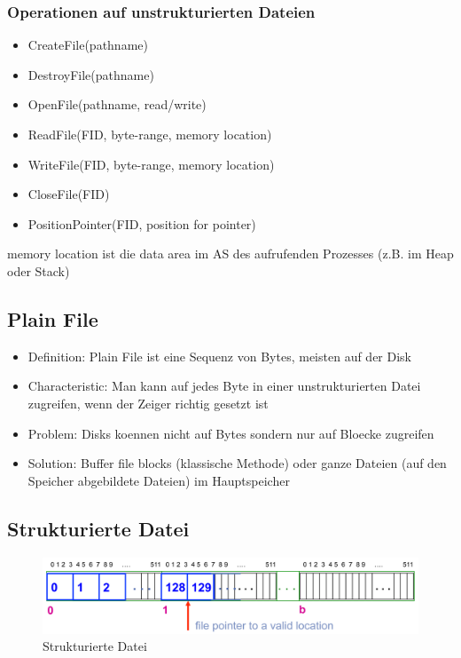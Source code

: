 \documentclass[a4paper]{scrreprt}
\begin{document}
\subsubsection{Operationen auf unstrukturierten Dateien}
\begin{itemize}
	\item CreateFile(pathname)
	\item DestroyFile(pathname)
	\item OpenFile(pathname, read/write)
	\item ReadFile(FID, byte-range, memory location)
	\item WriteFile(FID, byte-range, memory location)
	\item CloseFile(FID)
	\item PositionPointer(FID, position for pointer)
\end{itemize}

memory location ist die data area im AS des aufrufenden Prozesses (z.B. im Heap oder Stack)

\subsection{Plain File}
\begin{itemize}
	\item Definition: Plain File ist eine Sequenz von Bytes, meisten auf der Disk
	\item Characteristic: Man kann auf jedes Byte in einer unstrukturierten Datei zugreifen, wenn der Zeiger richtig gesetzt ist
	\item Problem: Disks koennen nicht auf Bytes sondern nur auf Bloecke zugreifen
	\item Solution: Buffer file blocks (klassische Methode) oder ganze Dateien (auf den Speicher abgebildete Dateien) im Hauptspeicher
\end{itemize}

\subsection{Strukturierte Datei}

\begin{figure}[ht]
\centering
\includegraphics[scale=0.4]{structured_file.png}
\caption{Strukturierte Datei}
\end{figure}
\end{document}
